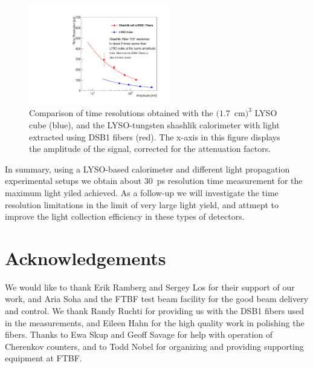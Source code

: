 \documentclass[12pt]{article}
\begin{document}
\begin{figure}[H] \centering
\includegraphics[width=0.55\textwidth]{figs/TimeResolutionVsEnergy_ShashlikDSB1FiberAndCube} 
\caption{\small Comparison of time resolutions obtained with the $(1.7$~cm$)^{3}$ LYSO cube (blue), 
and the LYSO-tungsten shashlik calorimeter with light extracted using DSB1 fibers (red). 
 The x-axis in this figure displays the amplitude of the
signal, corrected for the attenuation factors. }
\label{fig:ShashlikFiberAndCubeTOF}
\end{figure}

In summary, using a LYSO-based calorimeter and different light propagation experimental setups 
we obtain about $30$~ps resolution time measurement for the maximum light yiled achieved. 
As a follow-up we will investigate  the time resolution limitations in the limit of very large light yield, 
and attmept to improve the light collection efficiency in these types of detectors.

\section{Acknowledgements} We would like to thank Erik Ramberg and Sergey Los
for their support of our work, and Aria Soha and the FTBF test beam facility for
the good beam delivery and control. We thank Randy Ruchti for providing us with
the DSB1 fibers used in the measurements, and Eileen Hahn for the high quality
work in polishing the fibers. Thanks to Ewa Skup and Geoff Savage for help with
operation of Cherenkov counters, and to Todd Nobel for organizing and providing
supporting equipment at FTBF.


{}

\end{document}
